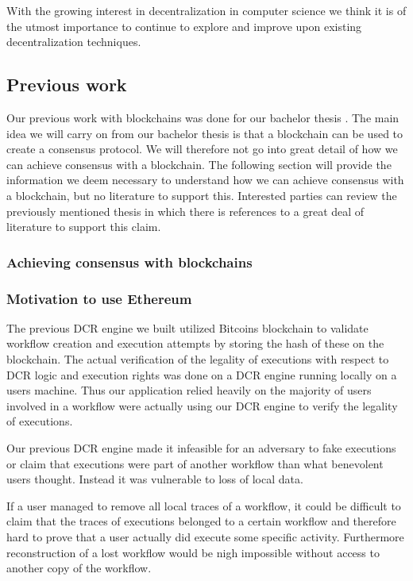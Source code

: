 \documentclass{article}
\begin{document}
	With the growing interest in decentralization in computer science we think it is of the utmost importance to continue to explore and improve upon existing decentralization techniques.

	\subsection{Previous work}
	Our previous work with blockchains was done for our bachelor thesis \cite{bachelor}. 
	The main idea we will carry on from our bachelor thesis is that a blockchain can be used to create a consensus protocol. 
	We will therefore not go into great detail of how we can achieve consensus with a blockchain. 
	The following section will provide the information we deem necessary to understand how we can achieve consensus with a blockchain, but no literature to support this. 
	Interested parties can review the previously mentioned thesis in which there is references to a great deal of literature to support this claim.
	\subsubsection{Achieving consensus with blockchains}

	\subsubsection{Motivation to use Ethereum}
	The previous DCR engine we built utilized Bitcoins blockchain to validate workflow creation and execution attempts by storing the hash of these on the blockchain.
	The actual verification of the legality of executions with respect to DCR logic and execution rights was done on a DCR engine running locally on a users machine.
	Thus our application relied heavily on the majority of users involved in a workflow were actually using our DCR engine to verify the legality of executions. 

	Our previous DCR engine made it infeasible for an adversary to fake executions or claim that executions were part of another workflow than what benevolent users thought.
	Instead it was vulnerable to loss of local data. 
	
	If a user managed to remove all local traces of a workflow, it could be difficult to claim that the traces of executions belonged to a certain workflow and therefore hard to prove that a user actually did execute some specific activity. Furthermore reconstruction of a lost workflow would be nigh impossible without access to another copy of the workflow.
\end{document}
